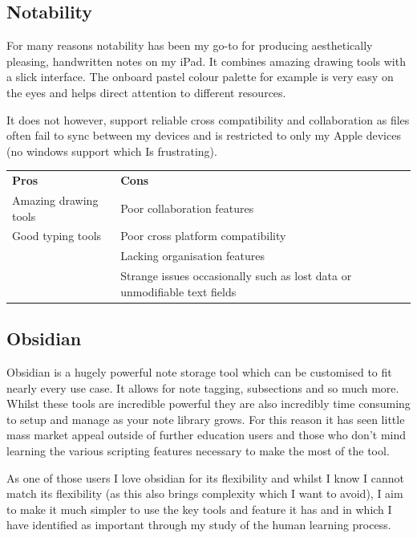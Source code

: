 \subsection*{Notability}
For many reasons notability has been my go-to for producing aesthetically pleasing, handwritten notes on my iPad. It combines amazing drawing tools with a slick interface. The onboard pastel colour palette for example is very easy on the eyes and helps direct attention to different resources.

It does not however, support reliable cross compatibility and collaboration as files often fail to sync between my devices and is restricted to only my Apple devices (no windows support which Is frustrating).

\begin{tabularx}{\textwidth}{>{\raggedright\arraybackslash}X>{\raggedright\arraybackslash}X}
    \rowcolor{gray!15} \textbf{Pros} & \textbf{Cons}                                                             \\ Amazing drawing tools   &   Poor collaboration features \\
    Good typing tools                & Poor cross platform compatibility                                         \\
                                     & Lacking organisation features                                             \\
                                     & Strange issues occasionally such as lost data or unmodifiable text fields \\
\end{tabularx}

\subsection*{Obsidian}
Obsidian is a hugely powerful note storage tool which can be customised to fit nearly every use case. It allows for note tagging, subsections and so much more. Whilst these tools are incredible powerful they are also incredibly time consuming to setup and manage as your note library grows. For this reason it has seen little mass market appeal outside of further education users and those who don’t mind learning the various scripting features necessary to make the most of the tool.

As one of those users I love obsidian for its flexibility and whilst I know I cannot match its flexibility (as this also brings complexity which I want to avoid), I aim to make it much simpler to use the key tools and feature it has and in which I have identified as important through my study of the human learning process.

